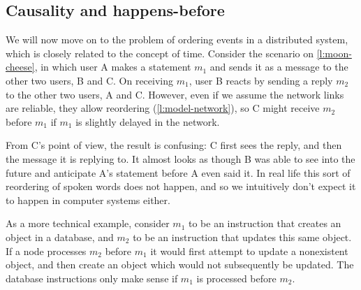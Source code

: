 \subsection{Causality and happens-before}\label{sec:causality}

We will now move on to the problem of ordering events in a distributed system, which is closely related to the concept of time.
Consider the scenario on \autoref{l:moon-cheese}, in which user A makes a statement $m_1$ and sends it as a message to the other two users, B and C.
On receiving $m_1$, user B reacts by sending a reply $m_2$ to the other two users, A and C.
However, even if we assume the network links are reliable, they allow reordering (\autoref{l:model-network}), so C might receive $m_2$ before $m_1$ if $m_1$ is slightly delayed in the network.

From C's point of view, the result is confusing: C first sees the reply, and then the message it is replying to.
It almost looks as though B was able to see into the future and anticipate A's statement before A even said it.
In real life this sort of reordering of spoken words does not happen, and so we intuitively don't expect it to happen in computer systems either.

As a more technical example, consider $m_1$ to be an instruction that creates an object in a database, and $m_2$ to be an instruction that updates this same object.
If a node processes $m_2$ before $m_1$ it would first attempt to update a nonexistent object, and then create an object which would not subsequently be updated.
The database instructions only make sense if $m_1$ is processed before $m_2$.

